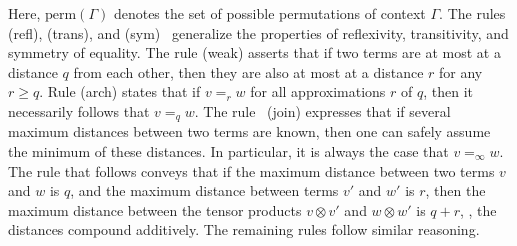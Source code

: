 Here, $\text{perm} (\Gamma)$ denotes the set of possible permutations of context $\Gamma$. 
The rules (refl), (trans), and (sym)  generalize the properties of reflexivity, transitivity, and symmetry of equality. 
The rule (weak) asserts that if two terms are at most at a distance $q$ from each other, then they are also at most at a distance $r$ for any $r \geq q$. Rule (arch) states that if $v =_r w$ for all approximations $r$ of $q$, then it necessarily follows that $v =_q w$. 
The rule  (join) expresses that if several maximum distances between two terms are known, then one can safely assume the minimum of these distances. In particular, it is always the case that $v =_{\infty} w$. 
The rule that follows conveys that if the maximum distance between two terms $v$ and $w$ is $q$, and the maximum distance between terms $v'$ and $w'$ is $r$, then the maximum distance between the tensor products $v \otimes v'$ and $w \otimes w'$ is $q + r$, \ie, the distances compound additively. The remaining rules follow similar reasoning.



